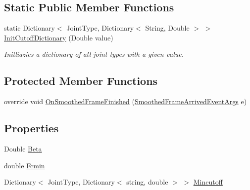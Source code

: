 \subsection*{Static Public Member Functions}
\begin{DoxyCompactItemize}
\item 
static Dictionary$<$ Joint\+Type, Dictionary$<$ String, Double $>$ $>$ \hyperlink{class_rowing_monitor_1_1_model_1_1_pipeline_1_1_one_euro_smoothing_filter_ab7a606c7bb286da8df457e553dc987eb}{Init\+Cutoff\+Dictionary} (Double value)
\begin{DoxyCompactList}\small\item\em Initliazies a dictionary of all joint types with a given value. \end{DoxyCompactList}\end{DoxyCompactItemize}
\subsection*{Protected Member Functions}
\begin{DoxyCompactItemize}
\item 
override void \hyperlink{class_rowing_monitor_1_1_model_1_1_pipeline_1_1_one_euro_smoothing_filter_ab4f64e95b9e02fb1562aeee79a75e695}{On\+Smoothed\+Frame\+Finished} (\hyperlink{class_rowing_monitor_1_1_model_1_1_smoothed_frame_arrived_event_args}{Smoothed\+Frame\+Arrived\+Event\+Args} e)
\end{DoxyCompactItemize}
\subsection*{Properties}
\begin{DoxyCompactItemize}
\item 
Double \hyperlink{class_rowing_monitor_1_1_model_1_1_pipeline_1_1_one_euro_smoothing_filter_aa9fe6be1fe6687a2fe7e1f8a77864527}{Beta}
\item 
double \hyperlink{class_rowing_monitor_1_1_model_1_1_pipeline_1_1_one_euro_smoothing_filter_a8bb01ead704c4df8a684e64789762a7d}{Fcmin}
\item 
Dictionary$<$ Joint\+Type, Dictionary$<$ string, double $>$ $>$ \hyperlink{class_rowing_monitor_1_1_model_1_1_pipeline_1_1_one_euro_smoothing_filter_a25584ff866652d0985ff677725a32f77}{Mincutoff}
\end{DoxyCompactItemize}
